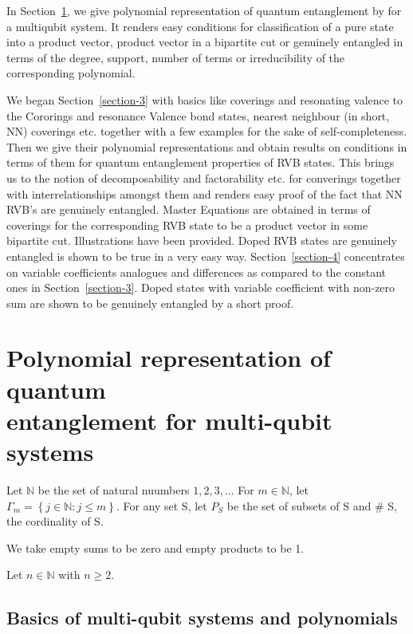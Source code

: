 \documentclass[a4paper,12pt]{article}
\theoremstyle{definition}
\theoremstyle{underlinethm}
\theoremstyle{definition}
\begin{document}
In Section~\ref{section-2}, we give polynomial representation of quantum entanglement by for a multiqubit system. It renders easy conditions for classification of a pure state into a product vector, product vector in a bipartite cut or genuinely entangled in terms of the degree, support, number of terms or irreducibility  of the corresponding polynomial.   

We began Section~\ref{section-3} with basics like coverings and resonating valence to the Cororings and resonance Valence bond states, nearest neighbour (in short, NN) coverings etc. together with a few examples for the sake of self-completeness. Then we give their polynomial representations and obtain results on conditions in terms of them for quantum entanglement properties of RVB states. This brings us to the notion of decomposability  and factorability  etc. for converings together with interrelationships amongst them and renders easy proof of the fact that NN RVB's are genuinely entangled. Master Equations are obtained in terms of coverings for the corresponding RVB state to be a product vector in some bipartite cut. Illustrations have been provided. Doped RVB states are genuinely entangled is shown to be true in a very easy way. Section~\ref{section-4} concentrates on variable coefficients analogues and differences as compared to the constant ones in Section~\ref{section-3}. Doped states with variable coefficient with non-zero sum are shown to be genuinely entangled by a short proof.


\section{Polynomial representation of quantum\\ entanglement for multi-qubit systems}\label{section-2}

Let $\mathbb{N}$ be the set of natural nuumbers $1,2,3, \ldots$ For $m\in \mathbb{N}$, let $\Gamma_{m}= \left\{ j \in \mathbb{N} : j \leq m \right\}$. For any set S, let $P_{S}$ be the set of subsets of S and $\#$ S, the cordinality of S.

We take empty sums to be zero and empty products to be 1.

Let $n \in \mathbb{N}$ with $n \geq 2$.

\subsection{Basics of multi-qubit systems and polynomials}\label{subsection-2.1}
\end{document}

